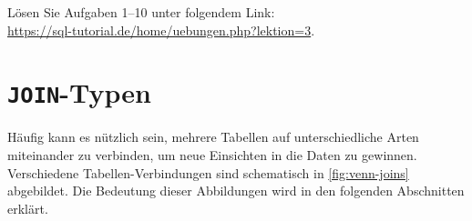 \begin{myexercise}
Lösen Sie Aufgaben 1--10 unter folgendem Link:\\
\url{https://sql-tutorial.de/home/uebungen.php?lektion=3}.
\end{myexercise}

\section{\texorpdfstring{\lstinline[style=sql]|JOIN|-Typen}{JOIN-Typen}}


Häufig kann es nützlich sein, mehrere Tabellen auf unterschiedliche Arten miteinander zu verbinden, um neue Einsichten in die Daten zu gewinnen. Verschiedene Tabellen-Verbindungen sind schematisch in \cref{fig:venn-joins} abgebildet. Die Bedeutung dieser Abbildungen wird in den folgenden Abschnitten erklärt.


